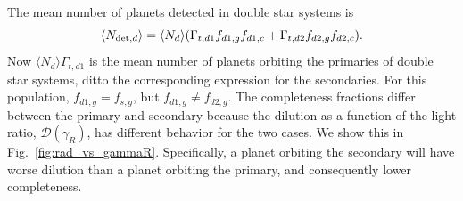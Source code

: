 \documentclass{emulateapj}
\begin{document}
The mean number of planets detected in double star systems is
\begin{equation}
\langle N_{{\rm det},d}\rangle = \langle N_d\rangle  
(\Gamma_{t,d1} f_{d1,g} f_{d1,c} + 
\Gamma_{t,d2} f_{d2,g} f_{d2,c} ).
\label{eq:N_det_d_2}
\end{equation}
Now $\langle N_d\rangle  \Gamma_{t,d1}$ is the mean number of planets orbiting 
the primaries of double star systems, ditto the corresponding expression for 
the secondaries.
For this population, $f_{d1,g} = f_{s,g}$, but $f_{d1,g} \neq f_{d2,g}$.
The completeness fractions differ between the primary and secondary because 
the dilution as a function of the light ratio, $\mathcal{D}(\gamma_R)$, has 
different behavior for the two cases.
We show this in Fig.~\ref{fig:rad_vs_gammaR}.
Specifically, a planet orbiting the secondary will have worse dilution than a 
planet orbiting the primary, and consequently lower completeness.
\end{document}
